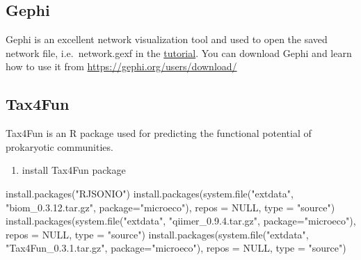\documentclass[
]{book}
\newenvironment{Shaded}{\begin{snugshade}}{\end{snugshade}}
\newcommand{\AttributeTok}[1]{\textcolor[rgb]{0.77,0.63,0.00}{#1}}
\newcommand{\ConstantTok}[1]{\textcolor[rgb]{0.00,0.00,0.00}{#1}}
\newcommand{\FunctionTok}[1]{\textcolor[rgb]{0.00,0.00,0.00}{#1}}
\newcommand{\NormalTok}[1]{#1}
\newcommand{\StringTok}[1]{\textcolor[rgb]{0.31,0.60,0.02}{#1}}
\providecommand{\tightlist}{%
  \setlength{\itemsep}{0pt}\setlength{\parskip}{0pt}}
\begin{document}
\hypertarget{gephi}{%
\subsection{Gephi}\label{gephi}}

Gephi is an excellent network visualization tool and used to open the saved network file,
i.e.~network.gexf in the \href{https://chiliubio.github.io/microeco_tutorial/model-based-class.html\#trans_network-class}{tutorial}.
You can download Gephi and learn how to use it from \url{https://gephi.org/users/download/}

\hypertarget{tax4fun}{%
\subsection{Tax4Fun}\label{tax4fun}}

Tax4Fun is an R package used for predicting the functional potential of prokaryotic communities.

\begin{enumerate}
\def\labelenumi{\arabic{enumi}.}
\tightlist
\item
  install Tax4Fun package
\end{enumerate}

\begin{Shaded}
\begin{Highlighting}[]
\FunctionTok{install.packages}\NormalTok{(}\StringTok{"RJSONIO"}\NormalTok{)}
\FunctionTok{install.packages}\NormalTok{(}\FunctionTok{system.file}\NormalTok{(}\StringTok{"extdata"}\NormalTok{, }\StringTok{"biom\_0.3.12.tar.gz"}\NormalTok{, }\AttributeTok{package=}\StringTok{"microeco"}\NormalTok{), }\AttributeTok{repos =} \ConstantTok{NULL}\NormalTok{, }\AttributeTok{type =} \StringTok{"source"}\NormalTok{)}
\FunctionTok{install.packages}\NormalTok{(}\FunctionTok{system.file}\NormalTok{(}\StringTok{"extdata"}\NormalTok{, }\StringTok{"qiimer\_0.9.4.tar.gz"}\NormalTok{, }\AttributeTok{package=}\StringTok{"microeco"}\NormalTok{), }\AttributeTok{repos =} \ConstantTok{NULL}\NormalTok{, }\AttributeTok{type =} \StringTok{"source"}\NormalTok{)}
\FunctionTok{install.packages}\NormalTok{(}\FunctionTok{system.file}\NormalTok{(}\StringTok{"extdata"}\NormalTok{, }\StringTok{"Tax4Fun\_0.3.1.tar.gz"}\NormalTok{, }\AttributeTok{package=}\StringTok{"microeco"}\NormalTok{), }\AttributeTok{repos =} \ConstantTok{NULL}\NormalTok{, }\AttributeTok{type =} \StringTok{"source"}\NormalTok{)}
\end{Highlighting}
\end{Shaded}
\end{document}
